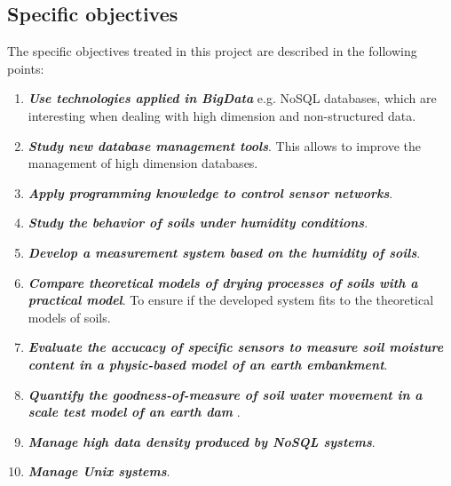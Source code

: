\subsection{Specific objectives}

The specific objectives treated in this project are described in the following points:

\begin{enumerate}

\item \textbf{\textit{Use technologies applied in BigData}} \cite{que_es_big_data, importancia_big_data, big_data_applications} e.g. NoSQL \cite{que_es_no_sql, sql_vs_nosql, nosql_databases} databases, which are interesting when dealing with high dimension and non-structured data.

\item \textbf{\textit{Study new database management tools}}. This allows to improve the management of high dimension databases.

\item \textbf{\textit{Apply programming knowledge to control sensor networks}}.

\item \textbf{\textit{Study the behavior of soils under humidity conditions}}.

\item \textbf{\textit{Develop a measurement system based on the humidity of soils}}.

\item \textbf{\textit{Compare theoretical models of drying processes of soils with a practical model}}. To ensure if the developed system fits to the theoretical models of soils.

\item \textbf{\textit{Evaluate the accucacy  of specific sensors to measure soil moisture content in a physic-based model of an earth embankment}}.

\item \textbf{\textit{Quantify the goodness-of-measure of soil water movement in a scale test model of an earth dam }}.

\item \textbf{\textit{Manage high data density produced by NoSQL systems}}.

\item \textbf{\textit{Manage Unix systems}}.

\end{enumerate}



